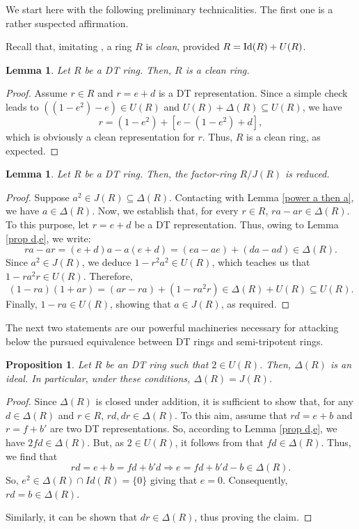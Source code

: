 \documentclass[12pt]{amsart}
\newtheorem{proposition}[theorem]{Proposition}
\newtheorem{lemma}[theorem]{Lemma}
\theoremstyle{definition}
\begin{document}
We start here with the following preliminary technicalities. The first one is a rather suspected affirmation.

\medskip

Recall that, imitating \cite{nstr}, a ring $R$ is {\it clean}, provided $R={\rm Id}(R)+U(R)$.

\begin{lemma}\label{gdt is clean}
Let $R$ be a DT ring. Then, $R$ is a clean ring.
\end{lemma}

\begin{proof}
Assume $r \in R$ and $r = e + d$ is a DT representation. Since a simple check leads to $((1 - e^2) - e) \in U(R)$ and $U(R) + \Delta(R) \subseteq U(R)$, we have
\[
r = (1 - e^2) + \left[e - (1 - e^2) + d\right],
\]
which is obviously a clean representation for $r$. Thus, $R$ is a clean ring, as expected.
\end{proof}

\begin{lemma}\label{R/J is reduced}
Let $R$ be a DT ring. Then, the factor-ring $R/J(R)$ is reduced.
\end{lemma}

\begin{proof}
Suppose $a^2 \in J(R) \subseteq \Delta(R)$. Contacting with Lemma \ref{power a then a}, we have $a \in \Delta(R)$. Now, we establish that, for every $r \in R$, $ra - ar \in \Delta(R)$. To this purpose, let $r = e + d$ be a DT representation. Thus, owing to Lemma \ref{prop d,e}, we write:
\[
ra - ar = (e + d)a - a(e + d) = (ea - ae) + (da - ad) \in \Delta(R).
\]
Since $a^2 \in J(R)$, we deduce $1 - r^2a^2 \in U(R)$, which teaches us that $1 - ra^2r \in U(R)$. Therefore,
\[
(1 - ra)(1 + ar) = (ar - ra) + (1 - ra^2r) \in \Delta(R) + U(R) \subseteq U(R).
\]
Finally, $1 - ra \in U(R)$, showing that $a \in J(R)$, as required.
\end{proof}

The next two statements are our powerful machineries necessary for attacking below the pursued equivalence between DT rings and semi-tripotent rings.

\begin{proposition}\label{Delta is ideal when 2 in U(R)}
Let $R$ be an DT ring such that $2 \in U(R)$. Then, $\Delta(R)$ is an ideal. In particular, under these conditions, $\Delta(R) = J(R)$.
\end{proposition}

\begin{proof}
Since $\Delta(R)$ is closed under addition, it is sufficient to show that, for any $d \in \Delta(R)$ and $r \in R$, $rd, dr \in \Delta(R)$. To this aim, assume that $rd = e + b$ and $r = f + b'$ are two DT representations. So, according to Lemma \ref{prop d,e}, we have $2fd \in \Delta(R)$. But, as $2 \in U(R)$, it follows from \cite[Lemma 1(2)]{lmr} that $fd \in \Delta(R)$. Thus, we find that
$$rd = e + b = fd + b'd  \Longrightarrow  e = fd+ b'd - b \in \Delta(R).$$
So, $e^2 \in \Delta(R) \cap Id(R) = \{0\}$ giving that $e = 0$. Consequently, $rd = b \in \Delta(R)$.

Similarly, it can be shown that $dr \in \Delta(R)$, thus proving the claim.
\end{proof}
\end{document}
